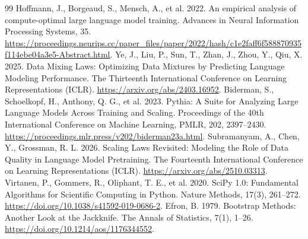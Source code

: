 \documentclass[bwprint]{gmcmthesis}
\begin{document}
\begin{thebibliography}{99}
 Hoffmann, J., Borgeaud, S., Mensch, A., et al. 2022. An empirical analysis of compute-optimal large language model training. Advances in Neural Information Processing Systems, 35. \url{https://proceedings.neurips.cc/paper_files/paper/2022/hash/c1e2faff6f588870935f114ebe04a3e5-Abstract.html}.  Ye, J., Liu, P., Sun, T., Zhan, J., Zhou, Y., Qiu, X. 2025. Data Mixing Laws: Optimizing Data Mixtures by Predicting Language Modeling Performance. The Thirteenth International Conference on Learning Representations (ICLR). \url{https://arxiv.org/abs/2403.16952}.  Biderman, S., Schoelkopf, H., Anthony, Q. G., et al. 2023. Pythia: A Suite for Analyzing Large Language Models Across Training and Scaling. Proceedings of the 40th International Conference on Machine Learning, PMLR, 202, 2397--2430. \url{https://proceedings.mlr.press/v202/biderman23a.html}.  Subramanyam, A., Chen, Y., Grossman, R. L. 2026. Scaling Laws Revisited: Modeling the Role of Data Quality in Language Model Pretraining. The Fourteenth International Conference on Learning Representations (ICLR). \url{https://arxiv.org/abs/2510.03313}.  Virtanen, P., Gommers, R., Oliphant, T. E., et al. 2020. SciPy 1.0: Fundamental Algorithms for Scientific Computing in Python. Nature Methods, 17(3), 261--272. \url{https://doi.org/10.1038/s41592-019-0686-2}.  Efron, B. 1979. Bootstrap Methods: Another Look at the Jackknife. The Annals of Statistics, 7(1), 1--26. \url{https://doi.org/10.1214/aos/1176344552}. \end{thebibliography}


\clearpage
\end{document}
